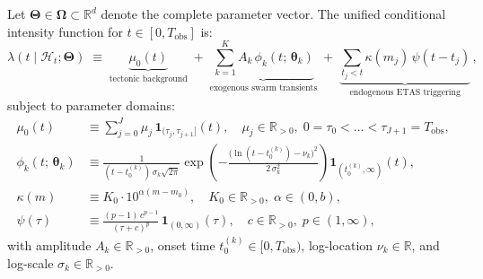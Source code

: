 \begin{definition}
  \label{def:unified_conditional_intensity}
  Let $\bm{\Theta} \in \bm{\Omega} \subset
  \mathbb{R}^{d}$ denote the complete parameter vector. The unified
  conditional intensity function for $t \in [0, T_{\mathrm{obs}}]$ is:
  \begin{equation}
    \lambda(t \mid \mathcal{H}_t; \bm{\Theta}) \;\equiv\;
    \underbrace{\mu_0(t)}_{\text{tectonic background}} \;+\;
    \underbrace{\sum_{k=1}^{K}
    A_k\,\phi_k(t;\,\bm{\theta}_k)}_{\text{exogenous swarm
    transients}} \;+\; \underbrace{\sum_{t_j < t}
    \kappa(m_j)\,\psi(t - t_j)}_{\text{endogenous ETAS triggering}}\,,
    \label{eq:unified_conditional_intensity}
  \end{equation}
  subject to parameter domains:
  \begin{align}
    \mu_0(t) &\equiv \sum_{j=0}^{J} \mu_j\,\mathbf{1}_{(\tau_j,
    \tau_{j+1}]}(t), \quad \mu_j \in \mathbb{R}_{>0},\; 0 = \tau_0 <
    \dots < \tau_{J+1} = T_{\mathrm{obs}}, \label{eq:background_spec} \\
    \phi_k(t;\,\bm{\theta}_k) &\equiv \frac{1}{(t -
    t_0^{(k)})\,\sigma_k\sqrt{2\pi}} \exp\!\left( -\frac{\bigl(\ln(t
      - t_0^{(k)}) - \nu_k\bigr)^2}{2\,\sigma_k^2}
    \right)\mathbf{1}_{(t_0^{(k)}, \infty)}(t), \label{eq:envelope_spec} \\
    \kappa(m) &\equiv K_0 \cdot 10^{\alpha(m - m_0)}, \quad K_0 \in
    \mathbb{R}_{>0},\; \alpha \in (0, b), \label{eq:etas_productivity} \\
    \psi(\tau) &\equiv \frac{(p - 1)\,c^{p-1}}{(\tau +
    c)^p}\,\mathbf{1}_{(0, \infty)}(\tau), \quad c \in
    \mathbb{R}_{>0},\; p \in (1, \infty), \label{eq:etas_kernel}
  \end{align}
  with amplitude $A_k \in \mathbb{R}_{>0}$, onset time $t_0^{(k)}
  \in [0, T_{\mathrm{obs}})$, log-location $\nu_k \in \mathbb{R}$,
  and log-scale $\sigma_k \in \mathbb{R}_{>0}$.
\end{definition}

